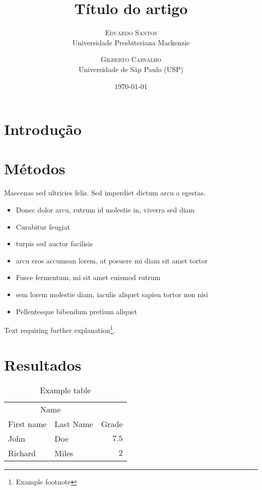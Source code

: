 \documentclass{article}
\title{Título do artigo}
\author{%
\textsc{Eduardo Santos}\\ %
\normalsize Universidade Presbiteriana Mackenzie \\ %
\and
\textsc{Gilberto Carvalho}\\%
\normalsize Universidade de Sãp Paulo (USP) \\ %
}
\date{\today} %
\begin{document}
\maketitle

\section{Introdução}

\blindtext

\blindtext


\section{Métodos}

Maecenas sed ultricies felis. Sed imperdiet dictum arcu a egestas. 
\begin{itemize}
\item Donec dolor arcu, rutrum id molestie in, viverra sed diam
\item Curabitur feugiat
\item turpis sed auctor facilisis
\item arcu eros accumsan lorem, at posuere mi diam sit amet tortor
\item Fusce fermentum, mi sit amet euismod rutrum
\item sem lorem molestie diam, iaculis aliquet sapien tortor non nisi
\item Pellentesque bibendum pretium aliquet
\end{itemize}
\blindtext

Text requiring further explanation\footnote{Example footnote}.


\section{Resultados}

\begin{table}
\caption{Example table}
\centering
\begin{tabular}{llr}
\toprule
\multicolumn{2}{c}{Name} \\
\cmidrule(r){1-2}
First name & Last Name & Grade \\
\midrule
John & Doe & $7.5$ \\
Richard & Miles & $2$ \\
\bottomrule
\end{tabular}
\end{table}
\end{document}
